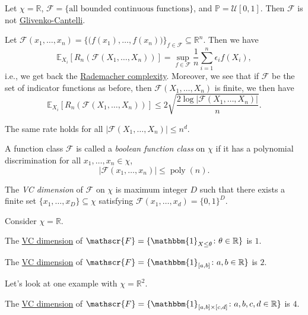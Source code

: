 \begin{eg}
	Let \(\chi = \mathbb{R} \), \(\mathscr{F} = \{ \text{all bounded continuous functions} \} \), and \(\mathbb{P} = \mathcal{U} [0, 1]\). Then \(\mathscr{F} \) is not \hyperref[def:Glivenko-Cantelli]{Glivenko-Cantelli}.
\end{eg}

Let \(\mathscr{F} (x_1, \dots , x_n) = \{ \big(f(x_1), \dots , f(x_n)\big) \} _{f\in \mathscr{F} } \subseteq \mathbb{R} ^n\). Then we have
\[
	\mathbb{E}_{X_i}\left[R_n( \mathscr{F} (X_1, \dots , X_n)) \right]
	= \sup _{f\in \mathscr{F} }\frac{1}{n}\sum_{i=1}^{n} \epsilon _i f(X_i),
\]
i.e., we get back the \hyperref[def:Rademacher-complexity]{Rademacher complexity}. Moreover, we see that if \(\mathscr{F} \) be the set of indicator functions as before, then \(\mathscr{F} (X_1, \dots , X_n)\) is finite, we then have
\[
	\mathbb{E}_{X_i}\left[R_n(\mathscr{F} (X_1, \dots , X_n)) \right]
	\leq 2 \sqrt{\frac{2 \log \vert \mathscr{F} (X_1, \dots , X_n) \vert }{n}} .
\]

\begin{remark}
	The same rate holds for all \(\vert \mathscr{F} (X_1, \dots , X_n) \vert \leq n^d\).
\end{remark}

\begin{definition}\label{def:boolean-function-class}
	A function class \(\mathscr{F} \) is called a \emph{boolean function class} on \(\chi \) if it has a polynomial discrimination for all \(x_1, \dots , x_n\in \chi \),
	\[
		\left\vert \mathscr{F} (x_1, \dots , x_n) \right\vert \leq \mathop{\mathrm{poly}}(n).
	\]
\end{definition}

\begin{definition}[VC dimension]\label{def:VC-dimension}
	The \emph{VC dimension} of \(\mathscr{F} \) on \(\chi \) is maximum integer \(D\) such that there exists a finite set \(\{ x_1, \dots , x_D \} \subseteq \chi \) satisfying \(\mathscr{F} (x_1, \dots , x_d) = \{ 0, 1 \} ^D\).
\end{definition}

Consider \(\chi = \mathbb{R} \).

\begin{eg}
	The \hyperref[def:VC-dimension]{VC dimension} of \(\mathscr{F} = \{ \mathbbm{1}_{X \leq \theta } \colon \theta \in \mathbb{R} \} \) is \(1\).
\end{eg}

\begin{eg}
	The \hyperref[def:VC-dimension]{VC dimension} of \(\mathscr{F} = \{ \mathbbm{1}_{[a, b]} \colon a, b \in \mathbb{R}  \} \) is \(2\).
\end{eg}

Let's look at one example with \(\chi = \mathbb{R} ^2\).
\begin{eg}
	The \hyperref[def:VC-dimension]{VC dimension} of \(\mathscr{F} = \{ \mathbbm{1}_{[a, b]\times [c, d]} \colon a, b , c, d\in \mathbb{R} \} \) is \(4\).
\end{eg}